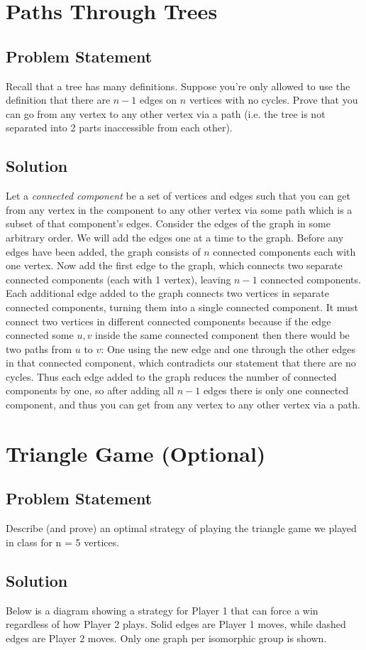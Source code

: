 \documentclass[12pt]{article}
\newcommand{\ProblemStatement}[1]{
\subsection*{Problem Statement}
#1
\subsection*{Solution}
}
\begin{document}
\section{Paths Through Trees}
\ProblemStatement{
Recall that a tree has many definitions. Suppose you're only allowed to use the definition that there are $n - 1$ edges on $n$ vertices with no cycles. Prove that you can go from any vertex to any other vertex via a path (i.e. the tree is not separated into 2 parts inaccessible from each other).
}

Let a \emph{connected component} be a set of vertices and edges such that you can get from any vertex in the component to any other vertex via some path which is a subset of that component's edges. Consider the edges of the graph in some arbitrary order. We will add the edges one at a time to the graph. Before any edges have been added, the graph consists of $n$ connected components each with one vertex. Now add the first edge to the graph, which connects two separate connected components (each with 1 vertex), leaving $n-1$ connected components. Each additional edge added to the graph connects two vertices in separate connected components, turning them into a single connected component. It must connect two vertices in different connected components because if the edge connected some $u,v$ inside the same connected component then there would be two paths from $u$ to $v$: One using the new edge and one through the other edges in that connected component, which contradicts our statement that there are no cycles. Thus each edge added to the graph reduces the number of connected components by one, so after adding all $n-1$ edges there is only one connected component, and thus you can get from any vertex to any other vertex via a path.


\section{Triangle Game (Optional)}
\ProblemStatement{
Describe (and prove) an optimal strategy of playing the triangle game we played in class for n = 5 vertices.
}

Below is a diagram showing a strategy for Player 1 that can force a win regardless of how Player 2 plays. Solid edges are Player 1 moves, while dashed edges are Player 2 moves. Only one graph per isomorphic group is shown.
\end{document}
